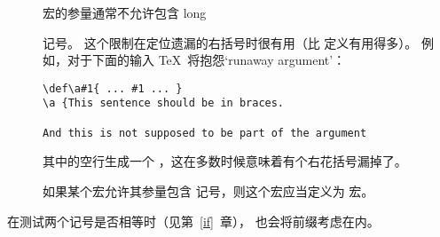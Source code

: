 \documentclass{book}
\begin{document}
\begin{description}
\item []
宏的参量通常不允许包含 \cstoidx long\par{} 记号。
这个限制在定位遗漏的右括号时很有用（比  定义有用得多）。
例如，对于下面的输入 \TeX\ 将抱怨`runaway argument'：
\begin{verbatim}
\def\a#1{ ... #1 ... }
\a {This sentence should be in braces.

And this is not supposed to be part of the argument
\end{verbatim}
其中的空行生成一个 ，这在多数时候意味着有个右花括号漏掉了。

如果某个宏允许其参量包含  记号，则这个宏应当定义为  宏。
\end{description}

在测试两个记号是否相等时（见第~\ref{if}~章）， 也会将前缀考虑在内。

\begin{comment}
With a little ingenuity it is possible 
for \cs{par} tokens to sneak into macro arguments anyway.
Consider the example
\begin{verbatim}
\def\a#1\par!{ ... }
\a bc\par ef\par!
\end{verbatim}
Here the macro \cs{a} is not \cs{long}, but the argument
is \verb>bc\par ef>, which contains a \cs{par} token.
However,
this is of no importance in general.
\end{comment}
\end{document}
